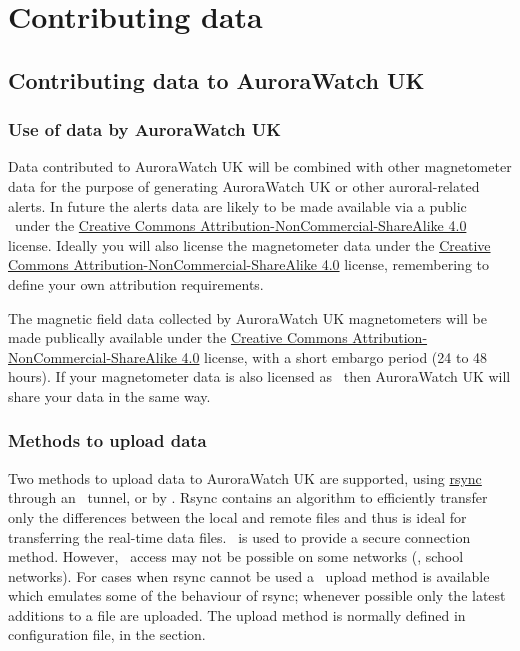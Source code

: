 \chapter{Contributing data}

\section{Contributing data to AuroraWatch UK}

\subsection{Use of data by AuroraWatch UK }

Data contributed to AuroraWatch UK will be combined with other
magnetometer data for the purpose of generating AuroraWatch UK or
other auroral-related alerts. In future the alerts data are likely to
be made available via a public \api\ under the
\href{\ccByNcSaFourUrl}{Creative Commons
  Attribution-NonCommercial-ShareAlike 4.0} license. Ideally you will
also license the magnetometer data under the
\href{\ccByNcSaFourUrl}{Creative Commons
  Attribution-NonCommercial-ShareAlike 4.0} license, remembering to
define your own attribution requirements.


The magnetic field data collected by AuroraWatch UK magnetometers will
be made publically available under the
\href{\ccByNcSaFourUrl}{Creative Commons
  Attribution-NonCommercial-ShareAlike 4.0} license, with a short
embargo period (24 to 48 hours). If your magnetometer data is also
licensed as \ccByNcSaFour\ then AuroraWatch UK will share your data in
the same way.

\subsection{Methods to upload data}
Two methods to upload data to AuroraWatch UK are supported, using
\href{\rsyncUrl}{rsync} through an \ssh\ tunnel, or by \http. Rsync
contains an algorithm to efficiently transfer only the differences
between the local and remote files and thus is ideal for transferring
the real-time data files. \ssh\ is used to provide a secure connection
method. However, \ssh\ access may not be possible on some networks
(\eg, school networks). For cases when rsync cannot be used a \http\
upload method is available which emulates some of the behaviour of
rsync; whenever possible only the latest additions to a file are
uploaded. The upload method is normally defined in 
configuration file, in the \filename{[upload]} section.

